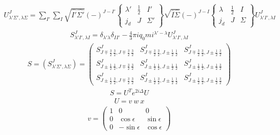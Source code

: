 \documentclass[11pt,aps]{revtex4}
\begin{document}
\begin{equation}
\begin{split}
U^J_{\lambda'\Sigma',\lambda\Sigma}=\sum_{I'}\sum_{I}\sqrt{\hat{I'}\hat{\Sigma'}}(-)^{J-I'}
  \begin{Bmatrix}
    \lambda' & \frac 1 2  & I'\\
    j_d & J & \Sigma'
  \end{Bmatrix}
\sqrt{\hat{I}\hat{\Sigma}}(-)^{J-I}
  \begin{Bmatrix}
    \lambda & \frac 1 2  & I\\
    j_d & J & \Sigma
  \end{Bmatrix}
U^J_{\lambda'I',\lambda I}
\end{split}
\end{equation}
\begin{equation}
\begin{split}
S^J_{\lambda' I',\lambda I}=\delta_{\lambda'\lambda}\delta_{II'}-\frac 4 3 \pi iq_0 mi^{\lambda'-\lambda}U^J_{\lambda' I',\lambda I}
\end{split}
\end{equation}
\begin{equation}
\begin{split}
S=(S^J_{\lambda'\Sigma', \lambda\Sigma})
=\begin{pmatrix}
S^J_{J\mp\frac3 2\ \frac3 2,J\mp\frac3 2\ \frac3 2} & S^J_{J\mp\frac3 2\ \frac3 2,J\pm\frac1 2\ \frac1 2} &  S^J_{J\mp\frac3 2\ \frac3 2,J\pm\frac1 2\ \frac3 2}\\
S^J_{J\pm\frac1 2\ \frac1 2,J\mp\frac3 2\ \frac3 2} & S^J_{J\pm\frac1 2\ \frac1 2,J\pm\frac1 2\ \frac1 2} &  S^J_{J\pm\frac1 2\ \frac1 2,J\pm\frac1 2\ \frac3 2}\\
S^J_{J\pm\frac1 2\ \frac3 2,J\mp\frac3 2\ \frac3 2} & S^J_{J\pm\frac1 2\ \frac3 2,J\pm\frac1 2\ \frac1 2} &  S^J_{J\pm\frac1 2\ \frac3 2,J\pm\frac1 2\ \frac3 2}
\end{pmatrix}
\end{split}
\end{equation}
\begin{equation}
\begin{split}
S=U^T e^{2i\Delta} U
\end{split}
\end{equation}
\begin{equation}
\begin{split}
U=v\ w\ x
\end{split}
\end{equation}
\begin{equation}
\begin{split}
v=
\begin{pmatrix}
1 & 0 & 0 \\
0 & \cos \epsilon & \sin \epsilon\\
0 & -\sin \epsilon & \cos \epsilon
\end{pmatrix}
\end{split}
\end{equation}
\end{document}
